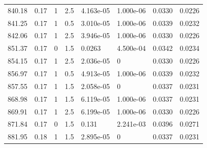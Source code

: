 \documentclass[preview]{standalone}
\begin{document}
{{{\begin{tabular}{L{1.2cm}C{1.2cm} C{0.3cm}C{0.5cm} C{1.4cm}C{1.4cm} C{1.4cm}C{1.4cm}}
  840.18  &  0.17  & 1     & 2.5 &  4.163e-05  & 1.000e-06  & 0.0330 &  0.0226   \\ 
  841.25  &  0.17  & 1     & 0.5 &  3.010e-05  & 1.000e-06  & 0.0339 &  0.0232   \\ 
  842.06  &  0.17  & 1     & 2.5 &  3.946e-05  & 1.000e-06  & 0.0330 &  0.0226   \\ 
  851.37  &  0.17  & 0     & 1.5 &  0.0263  & 4.500e-04  & 0.0342 &  0.0234   \\ 
  854.15  &  0.17  & 1     & 2.5 &  2.036e-05  & 0  & 0.0330 &  0.0226   \\ 
  856.97  &  0.17  & 1     & 0.5 &  4.913e-05  & 1.000e-06  & 0.0339 &  0.0232   \\ 
  857.55  &  0.17  & 1     & 1.5 &  2.058e-05  & 0  & 0.0337 &  0.0231   \\ 
  868.98  &  0.17  & 1     & 1.5 &  6.119e-05  & 1.000e-06  & 0.0337 &  0.0231   \\ 
  869.91  &  0.17  & 1     & 2.5 &  6.199e-05  & 1.000e-06  & 0.0330 &  0.0226   \\ 
  871.84  &  0.17  & 0     & 1.5 &  0.131  & 2.241e-03  & 0.0396 &  0.0271   \\ 
  881.95  &  0.18  & 1     & 1.5 &  2.895e-05  & 0  & 0.0337 &  0.0231   \\ 
\hline 
\end{tabular} 

}}}
\end{document}

